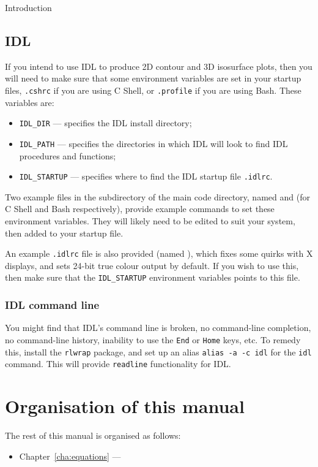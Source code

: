 \begin{chapter}{\label{cha:introduction}Introduction}
  \subsection{\label{subsec:idl_setup}IDL}
  If you intend to use IDL to produce 2D contour and 3D isosurface plots, then
  you will need to make sure that some environment variables are set in your
  startup files, \eg \verb".cshrc" if you are using C Shell, or \verb".profile"
  if you are using Bash.  These variables are:
  \begin{itemize}
    \item \verb"IDL_DIR" --- specifies the IDL install directory;
    \item \verb"IDL_PATH" --- specifies the directories in which IDL will look
      to find IDL procedures and functions;
    \item \verb"IDL_STARTUP" --- specifies where to find the IDL startup file
      \verb".idlrc".
  \end{itemize}
  Two example files in the  subdirectory of the main code
  directory, named  and  (for C Shell
  and Bash respectively), provide example commands to set these environment
  variables.  They will likely need to be edited to suit your system, then
  added to your startup file.

  An example \verb".idlrc" file is also provided (named ),
  which fixes some quirks with X displays, and sets 24-bit true colour output
  by default.  If you wish to use this, then make sure that the
  \verb"IDL_STARTUP" environment variables points to this file.

  \subsubsection{IDL command line}
  You might find that IDL's command line is broken, \ie no command-line
  completion, no command-line history, inability to use the \texttt{End} or
  \texttt{Home} keys, etc.  To remedy this, install the \texttt{rlwrap}
  package, and set up an alias \texttt{alias -a -c idl} for the \texttt{idl}
  command.  This will provide \texttt{readline} functionality for IDL.

  \section{Organisation of this manual}
  The rest of this manual is organised as follows:
  \begin{itemize}
    \item Chapter~\ref{cha:equations} ---
  \end{itemize}
\end{chapter}
